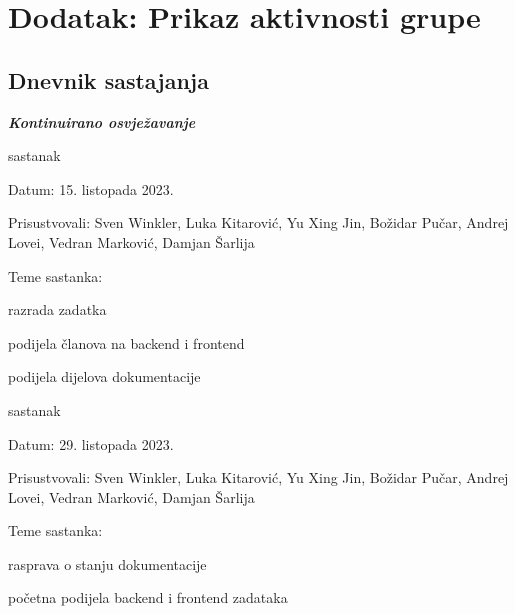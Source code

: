 \chapter*{Dodatak: Prikaz aktivnosti grupe}
		
		\section*{Dnevnik sastajanja}
		
		\textbf{\textit{Kontinuirano osvježavanje}}\\
		
		\begin{packed_enum}
			\item  sastanak
			
			\item[] \begin{packed_item}
				\item Datum: 15. listopada 2023.
				\item Prisustvovali: Sven Winkler, Luka Kitarović, Yu Xing Jin, Božidar Pučar, Andrej Lovei, Vedran Marković, Damjan Šarlija
				\item Teme sastanka:
				\begin{packed_item}
					\item  razrada zadatka
					\item  podijela članova na backend i frontend
					\item  podijela dijelova dokumentacije
				\end{packed_item}
			\end{packed_item}
			
			\item  sastanak
			\item[] \begin{packed_item}
				\item Datum: 29. listopada 2023.
				\item Prisustvovali: Sven Winkler, Luka Kitarović, Yu Xing Jin, Božidar Pučar, Andrej Lovei, Vedran Marković, Damjan Šarlija
				\item Teme sastanka:
				\begin{packed_item}
					\item  rasprava o stanju dokumentacije
					\item  početna podijela backend i frontend zadataka
				\end{packed_item}
			\end{packed_item}
			

\end{packed_enum}
